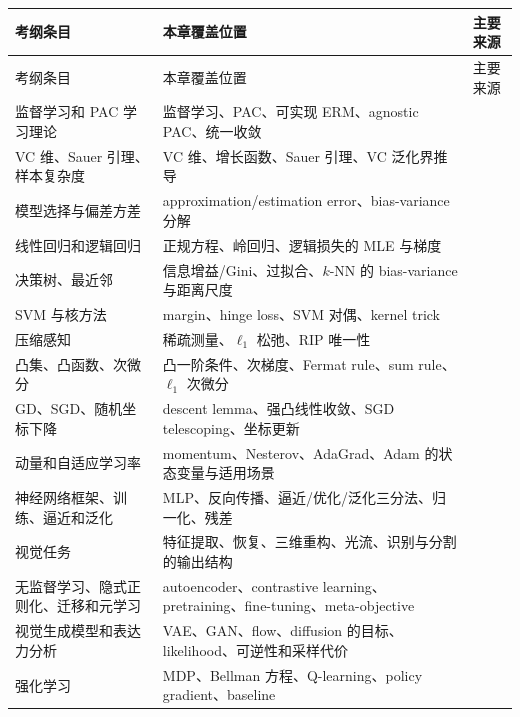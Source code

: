 \begingroup
\small
\begin{longtable}{L{0.34\textwidth}L{0.34\textwidth}L{0.22\textwidth}}
\toprule
考纲条目 & 本章覆盖位置 & 主要来源 \\
\midrule
\endfirsthead
\toprule
考纲条目 & 本章覆盖位置 & 主要来源 \\
\midrule
\endhead
监督学习和 PAC 学习理论 & 监督学习、PAC、可实现 ERM、agnostic PAC、统一收敛 & \cite{shalev2014uml,mohri2018foundations} \\
VC 维、Sauer 引理、样本复杂度 & VC 维、增长函数、Sauer 引理、VC 泛化界推导 & \cite{mohri2018foundations} \\
模型选择与偏差方差 & approximation/estimation error、bias-variance 分解 & \cite{shalev2014uml} \\
线性回归和逻辑回归 & 正规方程、岭回归、逻辑损失的 MLE 与梯度 & \cite{shalev2014uml} \\
决策树、最近邻 & 信息增益/Gini、过拟合、\(k\)-NN 的 bias-variance 与距离尺度 & \cite{shalev2014uml} \\
SVM 与核方法 & margin、hinge loss、SVM 对偶、kernel trick & \cite{mohri2018foundations} \\
压缩感知 & 稀疏测量、\(\ell_1\) 松弛、RIP 唯一性 & \cite{candes2006compressive} \\
凸集、凸函数、次微分 & 凸一阶条件、次梯度、Fermat rule、sum rule、\(\ell_1\) 次微分 & \cite{nesterov2018convex,beck2017first} \\
GD、SGD、随机坐标下降 & descent lemma、强凸线性收敛、SGD telescoping、坐标更新 & \cite{beck2017first,shalev2014uml} \\
动量和自适应学习率 & momentum、Nesterov、AdaGrad、Adam 的状态变量与适用场景 & \cite{nesterov2018convex,beck2017first} \\
神经网络框架、训练、逼近和泛化 & MLP、反向传播、逼近/优化/泛化三分法、归一化、残差 & \cite{goodfellow2016deep,bishop2023deep} \\
视觉任务 & 特征提取、恢复、三维重构、光流、识别与分割的输出结构 & \cite{szeliski2022vision,bishop2023deep} \\
无监督学习、隐式正则化、迁移和元学习 & autoencoder、contrastive learning、pretraining、fine-tuning、meta-objective & \cite{goodfellow2016deep,bishop2023deep} \\
视觉生成模型和表达力分析 & VAE、GAN、flow、diffusion 的目标、likelihood、可逆性和采样代价 & \cite{goodfellow2014gan,kingma2014vae,dinh2017realnvp,ho2020ddpm,song2021score} \\
强化学习 & MDP、Bellman 方程、Q-learning、policy gradient、baseline & \cite{mohri2018foundations,sutton2018rl} \\

\end{longtable}
